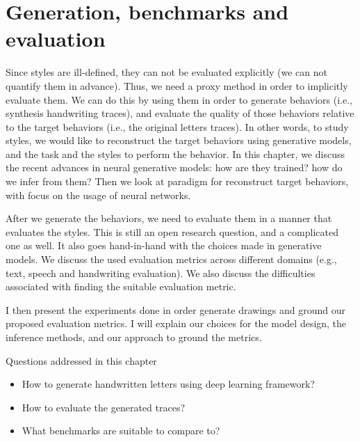 \chapter{Generation, benchmarks and evaluation}\label{ch:GBEM}

\minitoc%

\par Since styles are ill-defined, they can not be evaluated explicitly (we can not quantify them in advance). Thus, we need a proxy method in order to implicitly evaluate them. We can do this by using them in order to generate behaviors (i.e., synthesis handwriting traces), and evaluate the quality of those behaviors relative to the target behaviors (i.e., the original letters traces). In other words, to study styles, we would like to reconstruct the target behaviors using generative models, and the task and the styles to perform the behavior. In this chapter, we discuss the recent advances in neural generative models: how are they trained? how do we infer from them? Then we look at paradigm for reconstruct target behaviors, with focus on the usage of neural networks.

\par After we generate the behaviors, we need to evaluate them in a manner that evaluates the styles. This is still an open research question, and a complicated one as well. It also goes hand-in-hand with the choices made in generative models. We discuss the used evaluation metrics across different domains (e.g., text, speech and handwriting evaluation). We also discuss the difficulties associated with finding the suitable evaluation metric.

\par I then present the experiments done in order generate drawings and ground our proposed evaluation metrics. I will explain our choices for the model design, the inference methods, and our approach to ground the metrics.


\begin{mdframed}[backgroundcolor=blue!20]
    \begin{center}
        Questions addressed in this chapter
    \end{center}

    \begin{itemize}
        \item How to generate handwritten letters using deep learning framework?
        \item How to evaluate the generated traces?
        \item What benchmarks are suitable to compare to?
    \end{itemize}
\end{mdframed}

